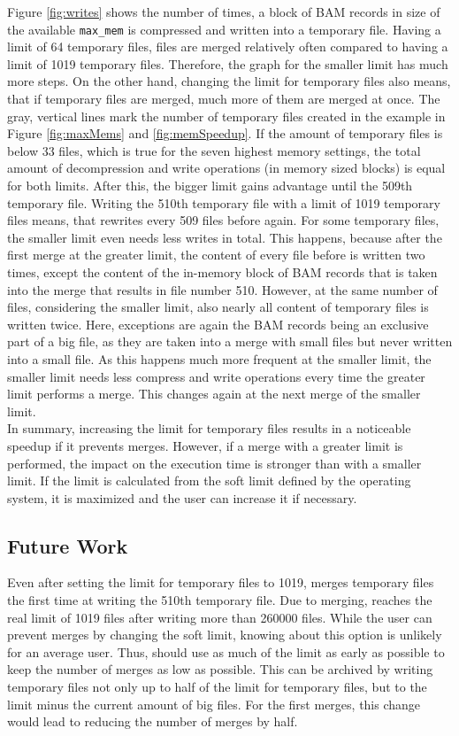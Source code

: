 Figure \ref{fig:writes} shows the number of times, a block of BAM records in size of the available \texttt{max\_mem} is compressed and written into a temporary file. Having a limit of 64 temporary files, files are merged relatively often compared to having a limit of 1019 temporary files. Therefore, the graph for the smaller limit has much more steps. On the other hand, changing the limit for temporary files also means, that if temporary files are merged, much more of them are merged at once. The gray, vertical lines mark the number of temporary files created in the example in Figure \ref{fig:maxMems} and \ref{fig:memSpeedup}. If the amount of temporary files is below 33 files, which is true for the seven highest memory settings, the total amount of decompression and write operations (in memory sized blocks) is equal for both limits. After this, the bigger limit gains advantage until the 509th temporary file. Writing the 510th temporary file with a limit of 1019 temporary files means, that \sort rewrites every 509 files before again. For some temporary files, the smaller limit even needs less writes in total. This happens, because after the first merge at the greater limit, the content of every file before is written two times, except the content of the in-memory block of BAM records that is taken into the merge that results in file number 510. However, at the same number of files, considering the smaller limit, also nearly all content of temporary files is written twice. Here, exceptions are again the BAM records being an exclusive part of a big file, as they are taken into a merge with small files but never written into a small file. As this happens much more frequent at the smaller limit, the smaller limit needs less compress and write operations every time the greater limit performs a merge. This changes again at the next merge of the smaller limit. \\
In summary, increasing the limit for temporary files results in a noticeable speedup if it prevents merges. However, if a merge with a greater limit is performed, the impact on the execution time is stronger than with a smaller limit. If the limit is calculated from the soft limit defined by the operating system, it is maximized and the user can increase it if necessary. 

\subsection{Future Work}
Even after setting the limit for temporary files to 1019, \sort merges temporary files the first time at writing the 510th temporary file. Due to merging, \sort reaches the real limit of 1019 files after writing more than 260000 files. While the user can prevent merges by changing the soft limit, knowing about this option is unlikely for an average user. Thus, \sort should use as much of the limit as early as possible to keep the number of merges as low as possible. This can be archived by writing temporary files not only up to half of the limit for temporary files, but to the limit minus the current amount of big files. For the first merges, this change would lead to reducing the number of merges by half.